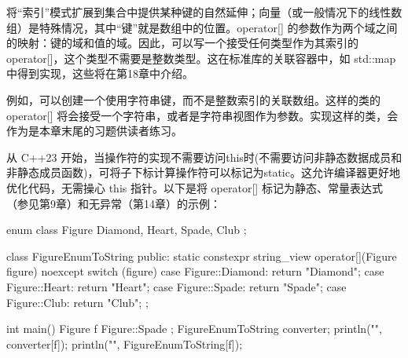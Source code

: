 
将“索引”模式扩展到集合中提供某种键的自然延伸；向量（或一般情况下的线性数组）是特殊情况，其中“键”就是数组中的位置。operator[] 的参数作为两个域之间的映射：键的域和值的域。因此，可以写一个接受任何类型作为其索引的operator[]，这个类型不需要是整数类型。这在标准库的关联容器中，如 std::map 中得到实现，这些将在第18章中介绍。

例如，可以创建一个使用字符串键，而不是整数索引的关联数组。这样的类的 operator[] 将会接受一个字符串，或者是字符串视图作为参数。实现这样的类，会作为是本章末尾的习题供读者练习。

\hspace*{\fill}



从 C++23 开始，当操作符的实现不需要访问this时(不需要访问非静态数据成员和非静态成员函数)，可将子下标计算操作符可以标记为static。这允许编译器更好地优化代码，无需操心 this 指针。以下是将 operator[] 标记为静态、常量表达式（参见第9章）和无异常（第14章）的示例：

\begin{cpp}
enum class Figure { Diamond, Heart, Spade, Club };

class FigureEnumToString
{
    public:
        static constexpr string_view operator[](Figure figure) noexcept
        {
            switch (figure) {
                case Figure::Diamond: return "Diamond";
                case Figure::Heart: return "Heart";
                case Figure::Spade: return "Spade";
                case Figure::Club: return "Club";
            }
        }
};

int main()
{
    Figure f { Figure::Spade };
    FigureEnumToString converter;
    println("{}", converter[f]);
    println("{}", FigureEnumToString{}[f]);
}
\end{cpp}












